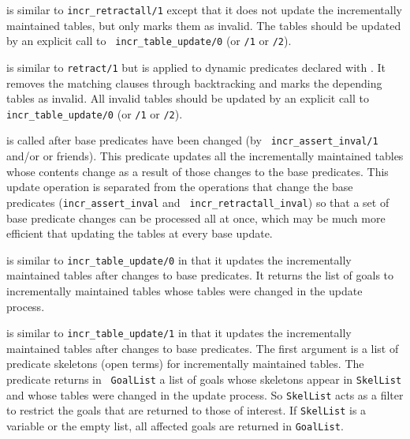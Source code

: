 \begin{description}
is similar to {\tt incr\_retractall/1} except that it does not update
the incrementally maintained tables, but only marks them as invalid.
The tables should be updated by an explicit call to {\tt
incr\_table\_update/0} (or {\tt /1} or {\tt /2}).

is similar to {\tt retract/1} but is applied to dynamic predicates
declared with .  It removes the matching
clauses through backtracking and marks the depending tables as
invalid.  All invalid tables should be updated by an explicit call to
{\tt incr\_table\_update/0} (or {\tt /1} or {\tt /2}).

is called after base predicates have been changed (by {\tt
incr\_assert\_inval/1} and/or  or
friends).  This predicate updates all the incrementally maintained
tables whose contents change as a result of those changes to the base
predicates.  This update operation is separated from the operations
that change the base predicates ({\tt incr\_assert\_inval} and {\tt
incr\_retractall\_inval}) so that a set of base predicate changes can be
processed all at once, which may be much more efficient that updating
the tables at every base update.

is similar to {\tt incr\_table\_update/0} in that it updates the
incrementally maintained tables after changes to base predicates.  It
returns the list of goals to incrementally maintained tables whose
tables were changed in the update process.

is similar to {\tt incr\_table\_update/1} in that it updates the
incrementally maintained tables after changes to base predicates.  The
first argument is a list of predicate skeletons (open terms) for
incrementally maintained tables.  The predicate returns in {\tt
GoalList} a list of goals whose skeletons appear in {\tt SkelList} and
whose tables were changed in the update process.  So {\tt SkelList}
acts as a filter to restrict the goals that are returned to those of
interest.  If {\tt SkelList} is a variable or the empty list, all
affected goals are returned in {\tt GoalList}.


\end{description}
